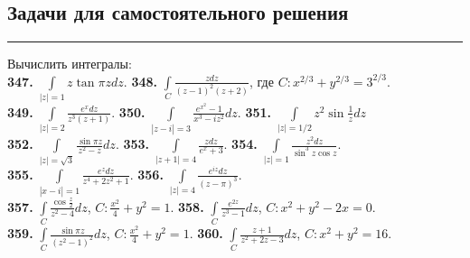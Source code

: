 \documentclass[a4paper,12pt]{article}
\begin{document}
\subsection*{\textbf{\large Задачи для самостоятельного решения}}
\noindent\rule{\textwidth}{1pt}
Вычислить интегралы:\\[0.33cm]
\textbf{347.} $\int\limits_{|z|=1} z \tan\pi z dz.$
\hspace{0.7cm}
\textbf{348.} $\int\limits_{C} \frac{z dz}{(z-1)^2(z+2)}$, \hspace{1cm} где $C: x^{2/3} + y^{2/3}=3^{2/3}$.\\[0.7cm]
\textbf{349.} $\int\limits_{|z|=2} \frac{e^x dz}{z^3(z+1)}$.
\hspace{1.4cm}
\textbf{350.} $\int\limits_{|z-i|=3} \frac{e^{x^2}-1}{x^3-iz^2}dz$.
\hspace{0.6cm}
\textbf{351.} $\int\limits_{|z|=1/2}z^2\sin\frac{1}{z}dz$
\\[0.7cm]
\textbf{352.} $\int\limits_{|z|=\sqrt{3}}\frac{\sin\pi z}{z^2-z}dz$.
\hspace{1.07cm}
\textbf{353.} $\int\limits_{|z+1|=4}\frac{z dz}{e^x+3}$.
\hspace{1.2cm}
\textbf{354.} $\int\limits_{|z|=1}\frac{z^2dz}{\sin ^3z\cos z}$.\\[0.7cm]
\textbf{355.} $\int\limits_{|x-i|=1}\frac{e^zdz}{z^4+2z^2+1}$.
\hspace{0.79cm}
\textbf{356.} $\int\limits_{|z|=4}\frac{e^{iz}dz}{(z-\pi)^3}$.\\[0.7cm]
\textbf{357.} $\int\limits_{C}\frac{\cos\frac{z}{2}}{z^2-4}dz$,
\hspace{0.7cm}
$C: \frac{x^2}{4}+y^2=1$.
\hspace{0.35cm}
\textbf{358.} $\int\limits_{C}\frac{e^{2z}}{z^3-1}dz$,
\hspace{0.3cm}
$C: x^2+y^2-2x=0$.\\[0.7cm]
\textbf{359.} $\int\limits_{C}\frac{\sin\pi z}{(z^2-1)^2}dz$,
\hspace{0.3cm}
$C: \frac{x^2}{4}+y^2=1$.
\hspace{0.2cm}
\textbf{360.} $\int\limits_{C}\frac{z+1}{z^2+2z-3}dz$,
\hspace{0.3cm}
$C: x^2+y^2=16.$
\end{document}
